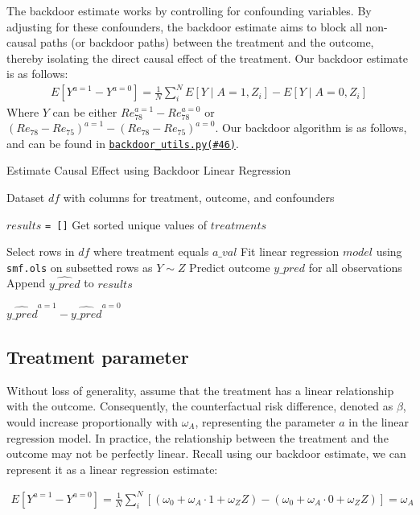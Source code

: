\documentclass[12pt]{article}
\begin{document}
The backdoor estimate works by controlling for confounding variables.  By adjusting for these confounders, the backdoor estimate aims to block all non-causal paths (or backdoor paths) between the treatment and the outcome, thereby isolating the direct causal effect of the treatment. Our backdoor estimate is as follows:
\begin{align}
E[Y^{a=1} - Y^{a=0}] = \frac{1}{N} \sum_i^{N} E[Y \mid A=1, Z_i] - E[Y \mid A=0, Z_i]
\end{align}
Where $Y$ can be either $Re_{78}^{a=1} - Re_{78}^{a=0}$ or $(Re_{78} - Re_{75})^{a=1} - (Re_{78} - Re_{75})^{a=0}$. Our backdoor algorithm is as follows, and can be found in \href{https://github.com/cs396s24/Proj-Job-Training/blob/main/utils/backdoor_utils.py#L45}{{\tt backdoor\_utils.py(\#46)}}.

\begin{algorithm}[H]
\caption{Estimate Causal Effect using Backdoor Linear Regression}
\begin{algorithmic}[1]
\Require Dataset $df$ with columns for treatment, outcome, and confounders

\State $results$ {\tt = []}
\State Get sorted unique values of $treatments$

    \State Select rows in $df$ where treatment equals $a\_val$
    \State Fit linear regression $model$ using {\tt smf.ols} on subsetted rows as $Y \sim Z$
    \State Predict outcome $y\_pred$ for all observations
    \State Append $\hat{y\_pred}$ to $results$
\EndFor

\State \Return $\hat{y\_pred}^{a=1} - \hat{y\_pred}^{a=0}$
\end{algorithmic}
\end{algorithm}

\subsection{Treatment parameter}

Without loss of generality, assume that the treatment has a linear relationship with the outcome. Consequently, the counterfactual risk difference, denoted as $\beta$, would increase proportionally with $\omega_A$, representing the parameter $a$ in the linear regression model. In practice, the relationship between the treatment and the outcome may not be perfectly linear. Recall using our backdoor estimate, we can represent it as a linear regression estimate:

\begin{align}
E[Y^{a=1} - Y^{a=0}] = \frac{1}{N} \sum_{i}^{N} [(\omega_0 + \omega_{A} \cdot 1 + \omega_{Z}Z) - (\omega_0 + \omega_{A} \cdot 0 + \omega_{Z}Z)] = \omega_{A}
\end{align}
\end{document}
